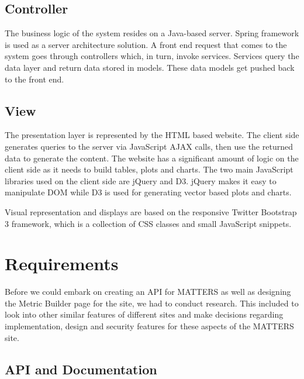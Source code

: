 		\subsection{Controller}
		
			The business logic of the system resides on a Java-based server. 
			Spring framework is used as a server architecture solution. A front 
			end request that comes to the system goes through controllers which, 
			in turn, invoke services. Services query the data layer and return 
			data stored	in models. These data models get pushed back to the 
			front end.
			
		\subsection{View}
			
			The presentation layer is represented by the HTML based website. The
			client side generates queries to the server via JavaScript AJAX 
			calls, then use the returned data to generate the content. The 
			website has a significant amount of logic on the client side as it 
			needs to build tables, plots and charts. The two main JavaScript 
			libraries used on the client side are jQuery and D3. jQuery makes it 
			easy to manipulate DOM while D3 is used for generating vector based 
			plots and charts.
			
			Visual representation and displays are based on the responsive 
			Twitter Bootstrap 3 framework, which is a collection of CSS classes 
			and small JavaScript snippets. 

	\section{Requirements}

		Before we could embark on creating an API for MATTERS as well as 
		designing the Metric Builder page for the site, we had to conduct 
		research. This included to look into other similar features of different 
		sites and make decisions regarding implementation, design and security 
		features for these aspects of the MATTERS site.

	\subsection{API and Documentation}

